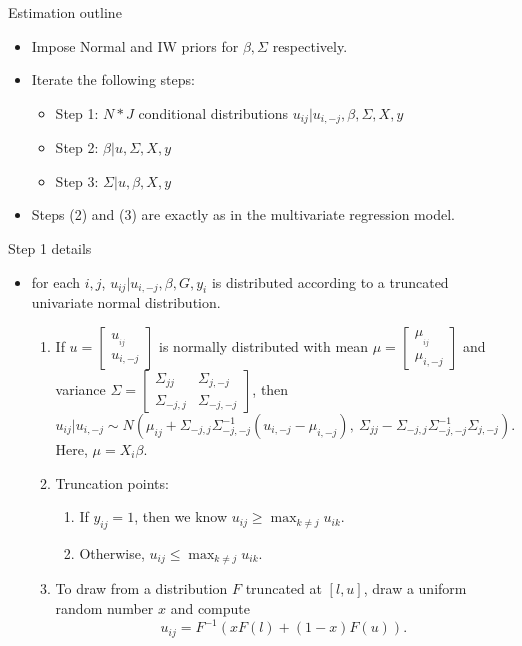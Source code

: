\documentclass[aspectratio=169]{beamer}
\begin{document}
%
\begin{frame}{Estimation outline}
\begin{itemize}
\item Impose Normal and IW priors for $\beta,\Sigma$ respectively.
\item Iterate the following steps:

\begin{itemize}
\item Step 1: $N*J$ conditional distributions $u_{ij}|u_{i,-j},\beta,\Sigma,X,y$
\item Step 2: $\beta|u,\Sigma,X,y$
\item Step 3: $\Sigma|u,\beta,X,y$
\end{itemize}
\item Steps (2) and (3) are exactly as in the multivariate regression model.
\end{itemize}
\end{frame}
%
\begin{frame}{Step 1 details}
\begin{itemize}
\item for each $i,j$, $u_{ij}|u_{i,-j},\beta,G,y_{i}$ is distributed according
to a truncated univariate normal distribution.
\begin{enumerate}
\item If $u=\left[\begin{array}{c}
u_{_{ij}}\\
u_{i,-j}
\end{array}\right]$ is normally distributed with mean $\mu=\left[\begin{array}{c}
\mu_{_{ij}}\\
\mu_{i,-j}
\end{array}\right]$ and variance $\Sigma=\left[\begin{array}{cc}
\Sigma_{jj} & \Sigma_{j,-j}\\
\Sigma_{-j,j} & \Sigma_{-j,-j}
\end{array}\right]$, then 
\[
u_{ij}|u_{i,-j}\sim N(\mu_{ij}+\Sigma_{-j,j}\Sigma_{-j,-j}^{-1} \left( u_{i,-j}-\mu_{i,-j}\right), \ \Sigma_{jj}-\Sigma_{-j,j}\Sigma_{-j,-j}^{-1}\Sigma_{j,-j}).
\]
Here, $\mu=X_{i}\beta.$
\item Truncation points: 

\begin{enumerate}
\item If $y_{ij}=1$, then we know $u_{ij}\geq\max_{k\neq j}u_{ik}.$
\item Otherwise, $u_{ij}\leq\max_{k\neq j}u_{ik}.$
\end{enumerate}
\item To draw from a distribution $F$ truncated at $[l,u]$, draw a uniform
random number $x$ and compute 
\[
u_{ij}=F^{-1}(xF(l)+(1-x)F(u)).
\]
\end{enumerate}
\end{itemize}
\end{frame}
\end{document}
